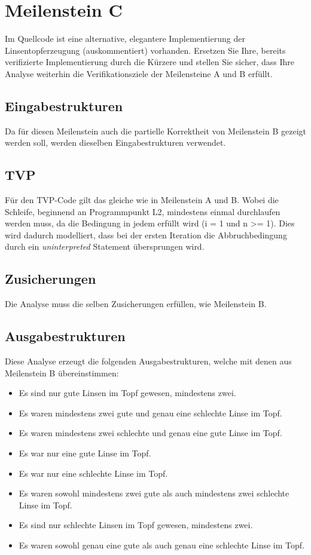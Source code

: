 \section{Meilenstein C}
Im Quellcode ist eine alternative, elegantere Implementierung der Linsentopferzeugung (auskommentiert) vorhanden. Ersetzen Sie Ihre, bereits verifizierte Implementierung durch die Kürzere und stellen Sie sicher, dass Ihre Analyse weiterhin die Verifikationsziele der Meilensteine A und B erfüllt.


\subsection{Eingabestrukturen}
Da für diesen Meilenstein auch die partielle Korrektheit von Meilenstein B gezeigt werden soll, werden dieselben Eingabestrukturen verwendet.


\subsection{TVP}
Für den TVP-Code gilt das gleiche wie in Meilenstein A und B. Wobei die Schleife, beginnend an Programmpunkt L2, mindestens einmal durchlaufen werden muss, da die Bedingung in jedem erfüllt wird (i = 1 und n >= 1). Dies wird dadurch modelliert, dass bei der ersten Iteration die Abbruchbedingung durch ein \emph{uninterpreted} Statement übersprungen wird.


\subsection{Zusicherungen}
Die Analyse muss die selben Zusicherungen erfüllen, wie Meilenstein B.


\subsection{Ausgabestrukturen}
Diese Analyse erzeugt die folgenden Ausgabestrukturen, welche mit denen aus Meilenstein B übereinstimmen:
\begin{itemize}[$\rightarrow$]
	\item Es sind nur gute Linsen im Topf gewesen, mindestens zwei.
	\item Es waren mindestens zwei gute und genau eine schlechte Linse im Topf.
	\item Es waren mindestens zwei schlechte und genau eine gute Linse im Topf.
	\item Es war nur eine gute Linse im Topf.
	\item Es war nur eine schlechte Linse im Topf.
	\item Es waren sowohl mindestens zwei gute als auch mindestens zwei schlechte Linse im Topf.
	\item Es sind nur schlechte Linsen im Topf gewesen, mindestens zwei.
	\item Es waren sowohl genau eine gute als auch genau eine schlechte Linse im Topf.
\end{itemize}